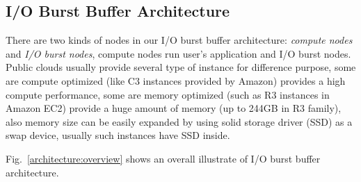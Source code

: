 \subsection{I/O Burst Buffer Architecture}


There are two kinds of nodes in our I/O burst buffer architecture: \emph{compute nodes} and \emph{I/O burst nodes}, compute nodes run user's application and I/O burst nodes.
Public clouds usually provide several type of instance for difference purpose, some are compute
optimized (like C3 instances provided by Amazon) provides a high compute performance, some are memory optimized (such as R3 instances in Amazon EC2) provide a huge amount of memory (up
to 244GB in R3 family), also memory size can be easily expanded by using solid storage driver (SSD)
as a swap device, usually such instances have SSD inside.

Fig.~\ref{architecture:overview} shows an overall illustrate of I/O burst buffer architecture.